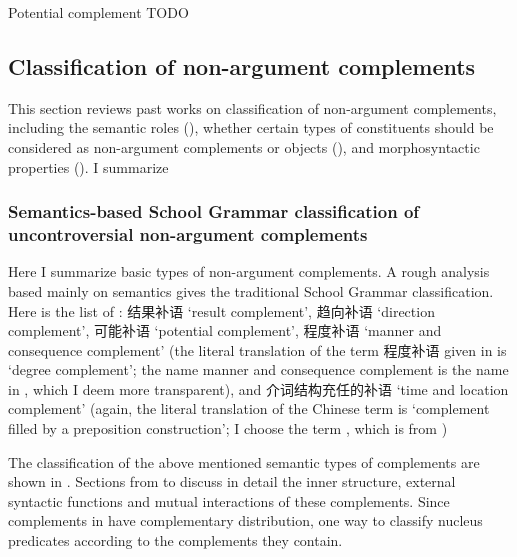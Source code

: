 \documentclass[../main.tex]{subfiles}
\begin{document}
Potential complement TODO

\subsection{Classification of non-argument complements}\label{sec:complement-classification}

This section reviews past works on classification of non-argument complements,
including the semantic roles (),
whether certain types of constituents should be considered as non-argument complements or objects 
(),
and morphosyntactic properties ().
I summarize %

\subsubsection{Semantics-based School Grammar classification of uncontroversial non-argument complements}\label{sec:complement-semantics}

Here I summarize basic types of non-argument complements. 
A rough analysis based mainly on semantics gives the traditional School Grammar classification.
Here is the list of \citet[]{xianhan2004}: 
结果补语 `result complement', 趋向补语 `direction complement', 可能补语 `potential complement',
程度补语 `manner and consequence complement'
(the literal translation of the term 程度补语 given in \citet{xianhan2004} is `degree complement';
the name manner and consequence complement is the name in \citet[10.3]{po2015chinese},
which I deem more transparent),
and 介词结构充任的补语 `time and location complement'
(again, the literal translation of the Chinese term is `complement filled by a preposition construction';
I choose the term , which is from ) %

The classification of the above mentioned semantic types of complements 
are shown in .
Sections from  to  
discuss in detail the inner structure, 
external syntactic functions 
and mutual interactions of these complements. 
Since complements in  have complementary distribution, %
one way to classify nucleus predicates according to the complements they contain. 
\end{document}
